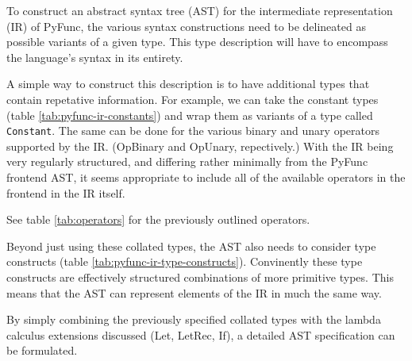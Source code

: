\documentclass{l4proj}
\begin{document}
To construct an abstract syntax tree (AST) for the intermediate representation (IR) of PyFunc, the various syntax constructions need to be delineated as possible variants of a given type.
This type description will have to encompass the language's syntax in its entirety.

A simple way to construct this description is to have additional types that contain repetative information.
For example, we can take the constant types (table \ref{tab:pyfunc-ir-constants}) and wrap them as variants of a type called \texttt{Constant}.
The same can be done for the various binary and unary operators supported by the IR.
(OpBinary and OpUnary, repectively.)
With the IR being very regularly structured, and differing rather minimally from the PyFunc frontend AST, it seems appropriate to include all of the available operators in the frontend in the IR itself.

See table \ref{tab:operators} for the previously outlined operators.

Beyond just using these collated types, the AST also needs to consider type constructs (table \ref{tab:pyfunc-ir-type-constructs}).
Convinently these type constructs are effectively structured combinations of more primitive types.
This means that the AST can represent elements of the IR in much the same way.

By simply combining the previously specified collated types with the lambda calculus extensions discussed (Let, LetRec, If), a detailed AST specification can be formulated.
\end{document}
